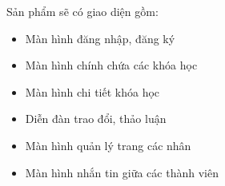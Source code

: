 \documentclass[./../main_file.tex]{subfiles}
\begin{document}
	Sản phẩm sẽ có giao diện gồm:
	\begin{itemize}
		\item Màn hình đăng nhập, đăng ký
		\item Màn hình chính chứa các khóa học
		\item Màn hình chi tiết khóa học
		\item Diễn đàn trao đổi, thảo luận
		\item Màn hình quản lý trang các nhân
		\item Màn hình nhắn tin giữa các thành viên
	\end{itemize}
	
	
\end{document}

